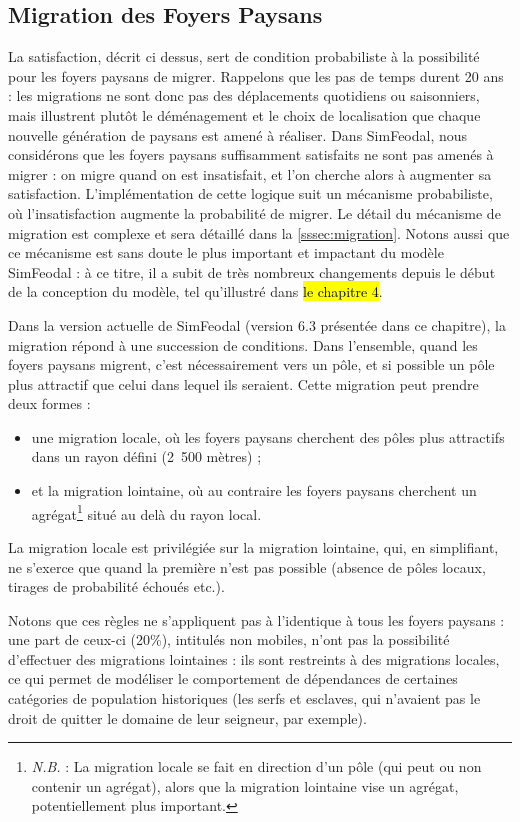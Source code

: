 \subsection{Migration des Foyers Paysans \label{meca-migration}}

La satisfaction, décrit ci dessus, sert de condition probabiliste à la possibilité pour les foyers paysans de migrer.
Rappelons que les pas de temps durent 20 ans : les migrations ne sont donc pas des déplacements quotidiens ou saisonniers, mais illustrent plutôt le déménagement et le choix de localisation que chaque nouvelle génération de paysans est amené à réaliser.
Dans SimFeodal, nous considérons que les foyers paysans suffisamment satisfaits ne sont pas amenés à migrer : on migre quand on est insatisfait, et l'on cherche alors à augmenter sa satisfaction.
L'implémentation de cette logique suit un mécanisme probabiliste, où l'insatisfaction augmente la probabilité de migrer.
Le détail du mécanisme de migration est complexe et sera détaillé dans la \cref{sssec:migration}.
Notons aussi que ce mécanisme est sans doute le plus important et impactant du modèle SimFeodal : à ce titre, il a subit de très nombreux changements depuis le début de la conception du modèle, tel qu'illustré dans \hl{le chapitre 4}.

Dans la version actuelle de SimFeodal (version 6.3 présentée dans ce chapitre), la migration répond à une succession de conditions.
Dans l'ensemble, quand les foyers paysans migrent, c'est nécessairement vers un pôle, et si possible un pôle plus attractif que celui dans lequel ils seraient.
Cette migration peut prendre deux formes :
\begin{itemize}
	\item une migration \og locale\fg{}, où les foyers paysans cherchent des pôles plus attractifs dans un rayon défini (2~500 mètres) ;
	\item et la migration \og lointaine\fg{}, où au contraire les foyers paysans cherchent un agrégat\footnote{
		\textit{N.B.} : La migration locale se fait en direction d'un pôle (qui peut ou non contenir un agrégat), alors que la migration lointaine vise un agrégat, potentiellement plus important.
	} situé au delà du rayon local.
\end{itemize} 
La migration locale est privilégiée sur la migration lointaine, qui, en simplifiant, ne s'exerce que quand la première n'est pas possible (absence de pôles locaux, tirages de probabilité échoués etc.).

Notons que ces règles ne s'appliquent pas à l'identique à tous les foyers paysans : une part de ceux-ci (20\%), intitulés \og non mobiles\fg{}, n'ont pas la possibilité d'effectuer des migrations lointaines : ils sont restreints à des migrations locales, ce qui permet de modéliser le comportement de dépendances de certaines catégories de population historiques (les serfs et esclaves, qui n'avaient pas le droit de quitter le domaine de leur seigneur, par exemple).


